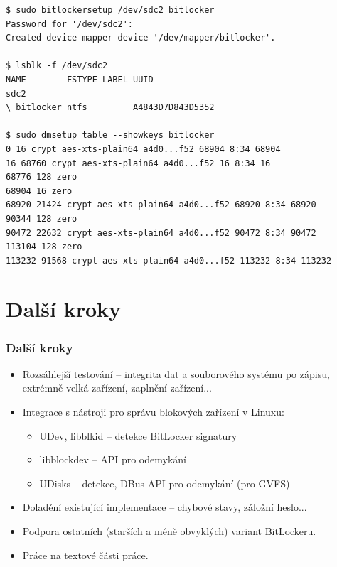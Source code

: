 \documentclass{beamer}
\begin{document}
\begin{frame}[fragile]
	\begin{lstlisting}[frame=none, basicstyle=\ttfamily\small, columns=fullflexible, keepspaces=true]
$ sudo bitlockersetup /dev/sdc2 bitlocker
Password for '/dev/sdc2': 
Created device mapper device '/dev/mapper/bitlocker'.

$ lsblk -f /dev/sdc2
NAME        FSTYPE LABEL UUID
sdc2                                                          
\_bitlocker ntfs         A4843D7D843D5352

$ sudo dmsetup table --showkeys bitlocker
0 16 crypt aes-xts-plain64 a4d0...f52 68904 8:34 68904
16 68760 crypt aes-xts-plain64 a4d0...f52 16 8:34 16
68776 128 zero 
68904 16 zero 
68920 21424 crypt aes-xts-plain64 a4d0...f52 68920 8:34 68920
90344 128 zero 
90472 22632 crypt aes-xts-plain64 a4d0...f52 90472 8:34 90472
113104 128 zero 
113232 91568 crypt aes-xts-plain64 a4d0...f52 113232 8:34 113232
	\end{lstlisting}

\end{frame}


\section{Další kroky}

\begin{frame}
  \frametitle{Další kroky}
	\begin{block}{}
		\begin{itemize}
			\item Rozsáhlejší testování -- integrita dat a souborového systému po zápisu, extrémně velká zařízení, zaplnění zařízení...
			\item Integrace s nástroji pro správu blokových zařízení v Linuxu:
			\begin{itemize}
				\item UDev, libblkid -- detekce BitLocker signatury
				\item libblockdev -- API pro odemykání
				\item UDisks -- detekce, DBus API pro odemykání (pro GVFS)
			\end{itemize}
			\item Doladění existující implementace -- chybové stavy, záložní heslo...
			\item Podpora ostatních (starších a méně obvyklých) variant BitLockeru.
			\item Práce na textové části práce.
		\end{itemize}
	\end{block}

\end{frame}
\end{document}
